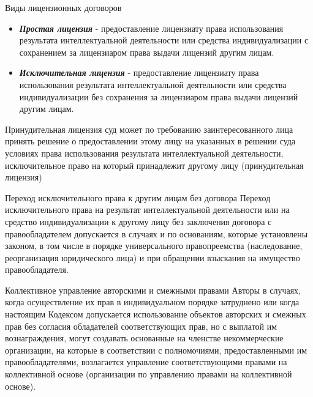 \documentclass[_Venture_p2.tex]{subfiles}
\begin{document}
\begin{frame}{Виды лицензионных договоров}
\begin{itemize}
	\item \textbf{\textit{Простая лицензия }}- предоставление лицензиату права использования результата интеллектуальной деятельности или средства индивидуализации с сохранением за лицензиаром права выдачи лицензий другим лицам.
	\item \textbf{\textit{Исключительная лицензия}} - предоставление лицензиату права использования результата интеллектуальной деятельности или средства индивидуализации без сохранения за лицензиаром права выдачи лицензий другим лицам.
\end{itemize}
\end{frame}

\begin{frame}{Принудительная лицензия}
суд может по требованию заинтересованного лица принять решение о предоставлении этому лицу на указанных в решении суда условиях права использования результата интеллектуальной деятельности, исключительное право на который принадлежит другому лицу (принудительная лицензия)
\end{frame}

\begin{frame}{Переход исключительного права к другим лицам без договора}
Переход исключительного права на результат интеллектуальной деятельности или на средство индивидуализации к другому лицу без заключения договора с правообладателем допускается в случаях и по основаниям, которые установлены законом, в том числе в порядке универсального правопреемства (наследование, реорганизация юридического лица) и при обращении взыскания на имущество правообладателя.
\end{frame}

\begin{frame}{Коллективное управление авторскими и смежными правами}
Авторы в случаях, когда осуществление их прав в индивидуальном порядке затруднено или когда настоящим Кодексом допускается использование объектов авторских и смежных прав без согласия обладателей соответствующих прав, но с выплатой им вознаграждения, могут создавать основанные на членстве некоммерческие организации, на которые в соответствии с полномочиями, предоставленными им правообладателями, возлагается управление соответствующими правами на коллективной основе (организации по управлению правами на коллективной основе).
\end{frame}
\end{document}
